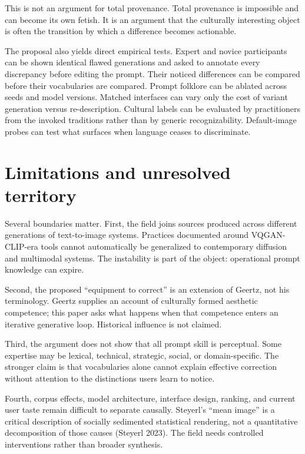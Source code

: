 \documentclass[
  11pt,
  letterpaper,
]{article}
\begin{document}
This is not an argument for total provenance. Total provenance is
impossible and can become its own fetish. It is an argument that the
culturally interesting object is often the transition by which a
difference becomes actionable.

The proposal also yields direct empirical tests. Expert and novice
participants can be shown identical flawed generations and asked to
annotate every discrepancy before editing the prompt. Their noticed
differences can be compared before their vocabularies are compared.
Prompt folklore can be ablated across seeds and model versions. Matched
interfaces can vary only the cost of variant generation versus
re-description. Cultural labels can be evaluated by practitioners from
the invoked traditions rather than by generic recognizability.
Default-image probes can test what surfaces when language ceases to
discriminate.

\section{Limitations and unresolved
territory}\label{limitations-and-unresolved-territory}

Several boundaries matter. First, the field joins sources produced
across different generations of text-to-image systems. Practices
documented around VQGAN-CLIP-era tools cannot automatically be
generalized to contemporary diffusion and multimodal systems. The
instability is part of the object: operational prompt knowledge can
expire.

Second, the proposed ``equipment to correct'' is an extension of Geertz,
not his terminology. Geertz supplies an account of culturally formed
aesthetic competence; this paper asks what happens when that competence
enters an iterative generative loop. Historical influence is not
claimed.

Third, the argument does not show that all prompt skill is perceptual.
Some expertise may be lexical, technical, strategic, social, or
domain-specific. The stronger claim is that vocabularies alone cannot
explain effective correction without attention to the distinctions users
learn to notice.

Fourth, corpus effects, model architecture, interface design, ranking,
and current user taste remain difficult to separate causally. Steyerl's
``mean image'' is a critical description of socially sedimented
statistical rendering, not a quantitative decomposition of those causes
(Steyerl 2023). The field needs controlled interventions rather than
broader synthesis.
\end{document}
